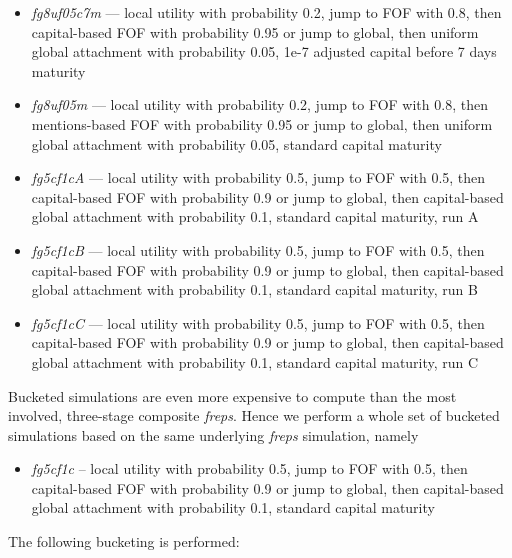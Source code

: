 \documentclass[10pt,oneside]{memoir}
\begin{document}
\begin{Spacing}{2}
\begin{itemize}
\item {\itshape fg8uf05c7m} --- local utility with probability 0.2, jump to FOF with 0.8, then capital-based FOF with probability 0.95 or jump to global, then uniform global attachment with probability 0.05, 1e-7 adjusted capital before 7 days maturity

\item {\itshape fg8uf05m} --- local utility with probability 0.2, jump to FOF with 0.8, then mentions-based FOF with probability 0.95 or jump to global, then uniform global attachment with probability 0.05, standard capital maturity

\item {\itshape fg5cf1cA} --- local utility with probability 0.5, jump to FOF with 0.5, then capital-based FOF with probability 0.9 or jump to global, then capital-based global attachment with probability 0.1, standard capital maturity, run A

\item {\itshape fg5cf1cB} --- local utility with probability 0.5, jump to FOF with 0.5, then capital-based FOF with probability 0.9 or jump to global, then capital-based global attachment with probability 0.1, standard capital maturity, run B

\item {\itshape fg5cf1cC} --- local utility with probability 0.5, jump to FOF with 0.5, then capital-based FOF with probability 0.9 or jump to global, then capital-based global attachment with probability 0.1, standard capital maturity, run C
\end{itemize}

Bucketed simulations are even more expensive to compute than the most involved, three-stage composite {\itshape freps}.  Hence we perform a whole set of bucketed simulations based on the same underlying {\itshape freps} simulation, namely 


\begin{itemize}


\item {\itshape fg5cf1c} -- local utility with probability 0.5, jump to FOF with 0.5, then capital-based FOF with probability 0.9 or jump to global, then capital-based global attachment with probability 0.1, standard capital maturity
\end{itemize}

The following bucketing is performed:


\begin{itemize}



\end{itemize}
\end{Spacing}
\end{document}
